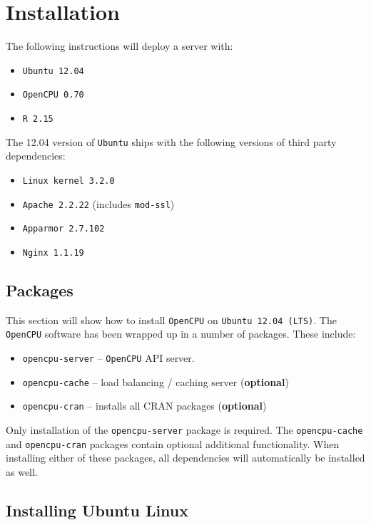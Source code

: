 \documentclass{scrartcl}
\begin{document}
\newpage 

\section{Installation}

The following instructions will deploy a server with:

\begin{itemize}
  \item \texttt{Ubuntu 12.04}
  \item \texttt{OpenCPU 0.70}
  \item \texttt{R 2.15}
\end{itemize}

\noindent The 12.04 version of \texttt{Ubuntu} ships with the following
versions of third party dependencies:

\begin{itemize}
  \item \texttt{Linux kernel 3.2.0}
  \item \texttt{Apache 2.2.22} (includes \texttt{mod-ssl})
  \item \texttt{Apparmor 2.7.102}
  \item \texttt{Nginx 1.1.19}
\end{itemize}

\subsection{Packages}


This section will show how to install \texttt{OpenCPU} on \texttt{Ubuntu 12.04
(LTS)}. The \texttt{OpenCPU} software has been wrapped up in a number of
packages. These include:
\begin{itemize}
  \item \texttt{opencpu-server} -- \texttt{OpenCPU} API server.
  \item \texttt{opencpu-cache} -- load balancing / caching server
  (\textbf{optional})
  \item \texttt{opencpu-cran} -- installs all CRAN packages (\textbf{optional})
\end{itemize}
Only installation of the \texttt{opencpu-server} package is required. The
\texttt{opencpu-cache} and \texttt{opencpu-cran} packages contain optional
additional functionality. When installing either of these packages, all
dependencies will automatically be installed as well.

\subsection{Installing Ubuntu Linux}
\end{document}
